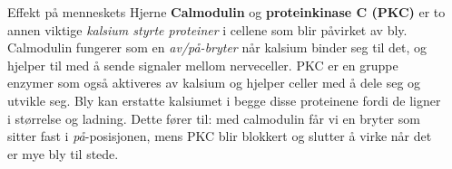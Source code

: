 \documentclass[final]{beamer}
\newlength{\sepwidth}
\newlength{\colwidth}
\newcommand{\separatorcolumn}{\begin{column}{\sepwidth}\end{column}}
\begin{document}
\begin{frame}[t]
\begin{columns}[t]
\begin{column}{\colwidth}
\begin{block}{Effekt på menneskets Hjerne}
				\textbf{Calmodulin} og \textbf{proteinkinase C (PKC)} er to annen viktige \textit{kalsium
					styrte proteiner} i cellene som blir påvirket av bly. Calmodulin fungerer som en
				\textit{av/på-bryter} når kalsium binder seg til det, og hjelper til med å sende signaler
				mellom nerveceller. PKC er en gruppe enzymer som også aktiveres av kalsium og hjelper celler
				med å dele seg og utvikle seg. Bly kan erstatte kalsiumet i begge disse proteinene fordi de
				ligner i størrelse og ladning. Dette fører til: med calmodulin får vi en bryter som sitter
				fast i \textit{på}-posisjonen, mens PKC blir blokkert og slutter å virke når det er mye bly
				til stede.

			\end{block}
		\end{column}

		\separatorcolumn

	\end{columns}
\end{frame}
\end{document}
